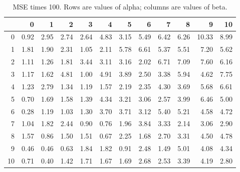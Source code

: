 \begin{table}[ht]
\centering
\begin{tabular}{rrrrrrrrrrrr}
  \hline
 & 0 & 1 & 2 & 3 & 4 & 5 & 6 & 7 & 8 & 9 & 10 \\ 
  \hline
0 & 0.92 & 2.95 & 2.74 & 2.64 & 4.83 & 3.15 & 5.49 & 6.42 & 6.26 & 10.33 & 8.99 \\ 
  1 & 1.81 & 1.90 & 2.31 & 1.05 & 2.11 & 5.78 & 6.61 & 5.37 & 5.51 & 7.20 & 5.62 \\ 
  2 & 1.11 & 1.26 & 1.81 & 3.44 & 3.11 & 3.16 & 2.02 & 6.71 & 7.09 & 7.60 & 6.16 \\ 
  3 & 1.17 & 1.62 & 4.81 & 1.00 & 4.91 & 3.89 & 2.50 & 3.38 & 5.94 & 4.62 & 7.75 \\ 
  4 & 1.23 & 2.79 & 1.34 & 1.19 & 1.57 & 2.19 & 2.35 & 4.30 & 3.69 & 5.68 & 6.61 \\ 
  5 & 0.70 & 1.69 & 1.58 & 1.39 & 4.34 & 3.21 & 3.06 & 2.57 & 3.99 & 6.46 & 5.00 \\ 
  6 & 0.28 & 1.19 & 1.03 & 1.30 & 3.70 & 3.71 & 3.12 & 5.40 & 5.21 & 4.58 & 4.72 \\ 
  7 & 1.04 & 1.82 & 2.44 & 0.90 & 0.76 & 1.96 & 3.84 & 3.33 & 2.14 & 3.06 & 2.90 \\ 
  8 & 1.57 & 0.86 & 1.50 & 1.51 & 0.67 & 2.25 & 1.68 & 2.70 & 3.31 & 4.50 & 4.78 \\ 
  9 & 0.46 & 0.46 & 0.63 & 1.84 & 1.82 & 0.91 & 2.48 & 1.49 & 5.01 & 4.08 & 4.34 \\ 
  10 & 0.71 & 0.40 & 1.42 & 1.71 & 1.67 & 1.69 & 2.68 & 2.53 & 3.39 & 4.19 & 2.80 \\ 
   \hline
\end{tabular}
\caption{MSE times 100. Rows are values of alpha; columns are values of beta.} 
\end{table}
